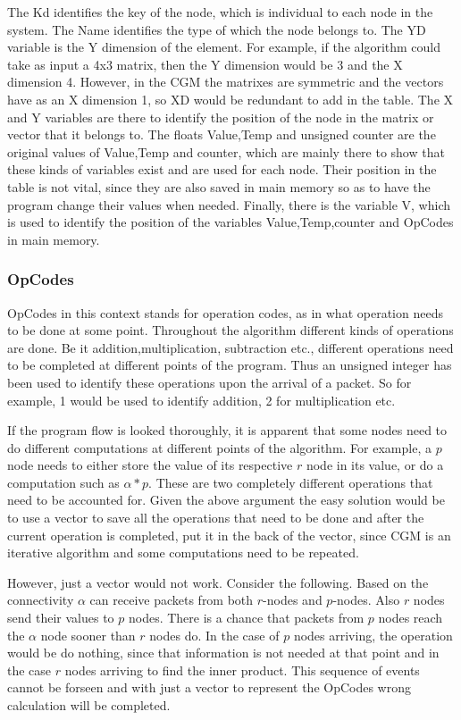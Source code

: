 \documentclass[12pt,a4paper]{article}
\begin{document}
The Kd identifies the key of the node, which is individual to each node in the system. The Name identifies the type of which the node belongs to. The YD variable is the Y dimension of the element. For example, if the algorithm could take as input a 4x3 matrix, then the Y dimension would be 3 and the X dimension 4. However, in the CGM the matrixes are symmetric and the vectors have as an X dimension 1, so XD would be redundant to add in the table. The X and Y variables are there to identify the position of the node in the matrix or vector that it belongs to. The floats Value,Temp and unsigned counter are the original values of Value,Temp and counter, which are mainly there to show that these kinds of variables exist and are used for each node. Their position in the table is not vital, since they are also saved in main memory so as to have the program change their values when needed. Finally, there is the variable V, which is used to identify the position of the variables Value,Temp,counter and OpCodes in main memory.
\subsubsection{OpCodes}
OpCodes in this context stands for operation codes, as in what operation needs to be done at some point. Throughout the algorithm different kinds of operations are done. Be it addition,multiplication, subtraction etc., different operations need to be completed at different points of the program. Thus an unsigned integer has been used to identify these operations upon the arrival of a packet. So for example, 1 would be used to identify addition, 2 for multiplication etc. 

If the program flow is looked thoroughly, it is apparent that some nodes need to do different computations at different points of the algorithm. For example, a $p$ node needs to either store the value of its respective $r$ node in its value, or do a computation such as $\alpha *p$. These are two completely different operations that need to be accounted for. Given the above argument the easy solution would be to use a vector to save all the operations that need to be done and after the current operation is completed, put it in the back of the vector, since CGM is an iterative algorithm and some computations need to be repeated.

However, just a vector would not work. Consider the following. Based on the connectivity $\alpha$ can receive packets from both $r$-nodes and $p$-nodes. Also $r$ nodes send their values to $p$ nodes. There is a chance that packets from $p$ nodes reach the $\alpha$ node sooner than $r$ nodes do. In the case of $p$ nodes arriving, the operation would be do nothing, since that information is not needed at that point and in the case $r$ nodes arriving to find the inner product.  This sequence of events cannot be forseen and with just a vector to represent the OpCodes wrong calculation will be completed.
\end{document}
